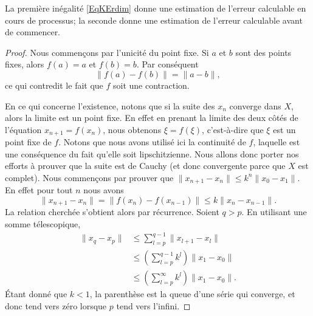 La première inégalité \eqref{EqKErdim} donne une estimation de l'erreur calculable en cours de processus; la seconde donne une estimation de l'erreur calculable avant de commencer.

\begin{proof}
	Nous commençons par l'unicité du point fixe. Si \( a\) et \( b\) sont des points fixes, alors \( f(a)=a\) et \( f(b)=b\). Par conséquent
	\begin{equation}
		\| f(a)-f(b) \|=\| a-b \|,
	\end{equation}
	ce qui contredit le fait que \( f\) soit une contraction.

	En ce qui concerne l'existence, notons que si la suite des \( x_n\) converge dans \( X\), alors la limite est un point fixe. En effet en prenant la limite des deux côtés de l'équation \( x_{n+1}=f(x_n)\), nous obtenons \( \xi=f(\xi)\), c'est-à-dire que \( \xi\) est un point fixe de \( f\). Notons que nous avons utilisé ici la continuité de \( f\), laquelle est une conséquence du fait qu'elle soit lipschitzienne. Nous allons donc porter nos efforts à prouver que la suite est de Cauchy (et donc convergente parce que \( X\) est complet). Nous commençons par prouver que \( \| x_{n+1}-x_n \|\leq k^n\| x_0-x_1 \|\). En effet pour tout \( n\) nous avons
	\begin{equation}
		\| x_{n+1}-x_n \|=\| f(x_n)-f(x_{n-1}) \|\leq k\| x_n-x_{n-1} \|.
	\end{equation}
	La relation cherchée s'obtient alors par récurrence. Soient \( q>p\). En utilisant une somme télescopique,
	\begin{subequations}
		\begin{align}
			\| x_q-x_p \| & \leq \sum_{l=p}^{q-1}\| x_{l+1}-x_l \|                 \\
			              & \leq \left( \sum_{l=p}^{q-1}k^l \right)\| x_1-x_0 \|   \\
			              & \leq \left(\sum_{l=p}^{\infty}k^l\right)\| x_1-x_0 \|.
		\end{align}
	\end{subequations}
	Étant donné que \( k<1\), la parenthèse est la queue d'une série qui converge, et donc tend vers zéro lorsque \( p\) tend vers l'infini.


\end{proof}
